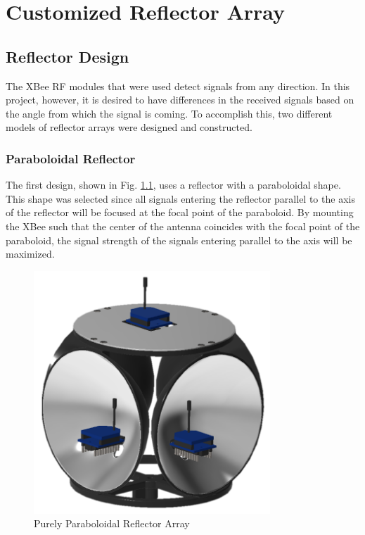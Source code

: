 \chapter{Customized Reflector Array}
\label{ch: Chapter3}


\section{Reflector Design}
The XBee RF modules that were used detect signals from any direction. In this project, however, it is desired to have differences in the received signals based on the angle from which the signal is coming. To accomplish this, two different models of reflector arrays were designed and constructed.

\subsection{Paraboloidal Reflector}
The first design, shown in Fig. \ref{fig:paraboloidalReflector}, uses a reflector with a paraboloidal shape. This shape was selected since all signals entering the reflector parallel to the axis of the reflector will be focused at the focal point of the paraboloid. By mounting the XBee such that the center of the antenna coincides with the focal point of the paraboloid, the signal strength of the signals entering parallel to the axis will be maximized.
\begin{figure}
    \centering
    \includegraphics[width=3.5in]{figs/img/paraboloidalReflector.png}
    \caption{Purely Paraboloidal Reflector Array}
    \label{fig:paraboloidalReflector}
\end{figure}

